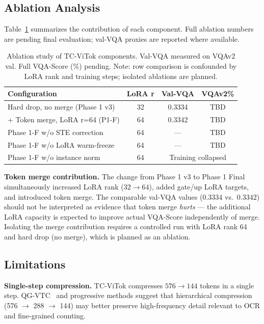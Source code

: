 \documentclass{article}
\begin{document}
\subsection{Ablation Analysis}

Table~\ref{tab:ablation} summarizes the contribution of each component.
Full ablation numbers are pending final evaluation; val-VQA proxies are reported
where available.

\begin{table}[t]
\caption{Ablation study of TC-ViTok components. Val-VQA measured on VQAv2 val.
Full VQA-Score (\%) pending. Note: row comparison is confounded by LoRA rank
and training steps; isolated ablations are planned.}
\label{tab:ablation}
\vskip 0.1in
\centering
\begin{small}
\begin{tabular}{lccc}
\toprule
\textbf{Configuration} & \textbf{LoRA r} & \textbf{Val-VQA} & \textbf{VQAv2\%} \\
\midrule
Hard drop, no merge (Phase 1 v3) & 32 & 0.3334 & TBD \\
+ Token merge, LoRA r=64 (P1-F) & 64 & 0.3342 & TBD \\
\midrule
Phase 1-F w/o STE correction     & 64 & — & TBD \\
Phase 1-F w/o LoRA warm-freeze   & 64 & — & TBD \\
Phase 1-F w/o instance norm      & 64 & \multicolumn{2}{c}{Training collapsed} \\
\bottomrule
\end{tabular}
\end{small}
\end{table}

\textbf{Token merge contribution.}
The change from Phase 1 v3 to Phase 1 Final simultaneously increased LoRA rank
($32 \to 64$), added gate/up LoRA targets, and introduced token merge.
The comparable val-VQA values ($0.3334$ vs.\ $0.3342$) should not be interpreted
as evidence that token merge \emph{hurts} — the additional LoRA capacity is expected
to improve actual VQA-Score independently of merge.
Isolating the merge contribution requires a controlled run with LoRA rank 64 and
hard drop (no merge), which is planned as an ablation.

\subsection{Limitations}

\textbf{Single-step compression.} TC-ViTok compresses $576 \to 144$ tokens in a single
step. QG-VTC~\cite{li2025qgvtc} and progressive methods suggest that hierarchical
compression (576 $\to$ 288 $\to$ 144) may better preserve high-frequency detail
relevant to OCR and fine-grained counting.
\end{document}
